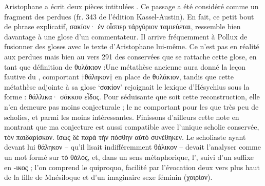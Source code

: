 {{}Aristophane a écrit deux pièces intitulées . Ce passage a été considéré comme un fragment des  perdues (fr. 343 de l'édition Kassel-Austin). En fait, ce petit bout de phrase explicatif, σακίον· ἐν οἷσπερ τἀργύριον ταμιεύεται, ressemble bien davantage à une glose d'un commentateur. Il arrive fréquemment à Pollux de fusionner des gloses avec le texte d'Aristophane lui-même. Ce n'est pas en réalité aux  perdues mais bien au vers 291 des  conservées que se rattache cette glose, en tant que définition de θυλάκιον :Une métathèse ancienne aura donné la leçon fautive du , comportant †θάληκον† en place de θυλάκιον, tandis que cette métathèse adjointe à sa glose `σακίον' rejoignait le lexique d'Hésychius sous la forme : θάλλικα· σάκκου εἶδος. 
Pour séduisante que soit cette reconstruction, elle n'en demeure pas moins conjecturale ; le  ne comportant pour les  que très peu de scholies, et parmi les moins intéressantes.
Finissons d'ailleurs cette note en montrant que ma conjecture est aussi compatible avec l'unique scholie conservée, τὸν παιδαρίσκον. ἴσως δὲ παρὰ τὴν πόσθην αὐτὸ συνέθηκεν. Le scholiaste ayant devant lui θάληκον -- qu'il lisait indifféremment θάλικον -- devait l'analyser comme un mot formé sur τὸ θάλος,  et, dans un sens métaphorique, l', suivi d'un suffixe en -ικος ; l'on comprend le quiproquo, facilité par l'évocation deux vers plus haut de la fille de Mnésiloque et d'un imaginaire sexe féminin (χοιρίον).}
